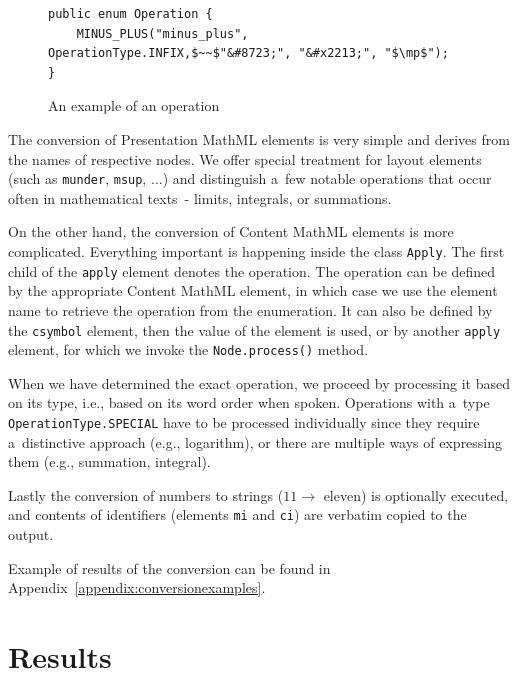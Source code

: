 \documentclass[11pt,oneside,final]{fithesis2}
\def\s#1{#1\index{#1}}
\begin{document}
\begin{figure}[!ht]
\begin{lstlisting}[mathescape=true]
public enum Operation {
	MINUS_PLUS("minus_plus", OperationType.INFIX,$~~$"&#8723;", "&#x2213;", "$\mp$");
}
\end{lstlisting}
\caption{An example of an operation}
\label{fig:converter-operation}
\end{figure}

The conversion of \s{Presentation MathML} elements is very simple and derives from the names of respective nodes. We offer special treatment for layout elements (such as \texttt{munder}, \texttt{msup}, $\ldots$) and distinguish a~few notable operations that occur often in mathematical texts~- limits, integrals, or summations. 

On the other hand, the conversion of \s{Content MathML} elements is more complicated. Everything important is happening inside the class \texttt{Apply}. The first child of the \texttt{apply} element denotes the operation. The operation can be defined by the appropriate Content MathML element, in which case we use the element name to retrieve the operation from the enumeration. It can also be defined by the \texttt{csymbol} element, then the value of the element is used, or by another \texttt{apply} element, for which we invoke the \texttt{Node.process()} method. 

When we have determined the exact operation, we proceed by processing it based on its type, i.e., based on its word order when spoken. Operations with a~type \texttt{OperationType.SPECIAL} have to be processed individually since they require a~distinctive approach (e.g., logarithm), or there are multiple ways of expressing them (e.g., summation, integral).

Lastly the conversion of numbers to strings ($11 \rightarrow$ eleven) is optionally executed, and contents of identifiers (elements \texttt{mi} and \texttt{ci}) are verbatim copied to the output. 

Example of results of the conversion can be found in Appendix~\ref{appendix:conversionexamples}.

\chapter{Results}
\label{chapter:results}
\end{document}
